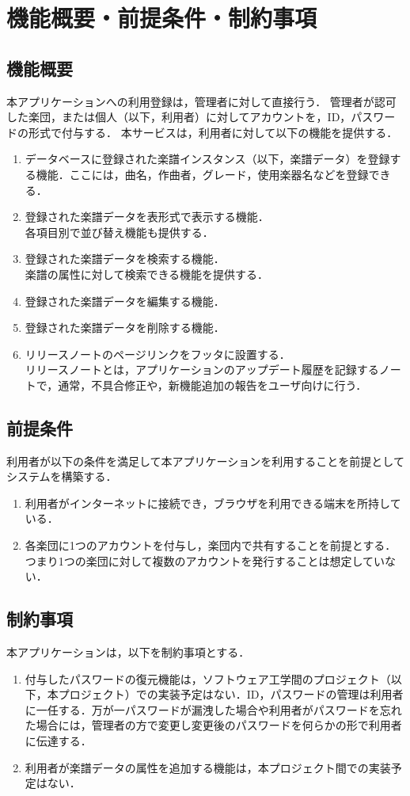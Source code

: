 \chapter{機能概要・前提条件・制約事項}
\section{機能概要}
本アプリケーションへの利用登録は，管理者に対して直接行う．
管理者が認可した楽団，または個人（以下，利用者）に対してアカウントを，ID，パスワードの形式で付与する．
本サービスは，利用者に対して以下の機能を提供する．
\begin{enumerate}
    \item データベースに登録された楽譜インスタンス（以下，楽譜データ）を登録する機能．ここには，曲名，作曲者，グレード，使用楽器名などを登録できる．
    \item 登録された楽譜データを表形式で表示する機能．\\
          各項目別で並び替え機能も提供する．
    \item 登録された楽譜データを検索する機能．\\
          楽譜の属性に対して検索できる機能を提供する．
    \item 登録された楽譜データを編集する機能．
    \item 登録された楽譜データを削除する機能．
    \item リリースノートのページリンクをフッタに設置する．\\
          リリースノートとは，アプリケーションのアップデート履歴を記録するノートで，通常，不具合修正や，新機能追加の報告をユーザ向けに行う．
\end{enumerate}
\section{前提条件}
利用者が以下の条件を満足して本アプリケーションを利用することを前提としてシステムを構築する．
\begin{enumerate}
    \item 利用者がインターネットに接続でき，ブラウザを利用できる端末を所持している．
    \item 各楽団に1つのアカウントを付与し，楽団内で共有することを前提とする．つまり1つの楽団に対して複数のアカウントを発行することは想定していない．
\end{enumerate}
\section{制約事項}
本アプリケーションは，以下を制約事項とする．
\begin{enumerate}
    \item 付与したパスワードの復元機能は，ソフトウェア工学間のプロジェクト（以下，本プロジェクト）での実装予定はない．ID，パスワードの管理は利用者に一任する．万が一パスワードが漏洩した場合や利用者がパスワードを忘れた場合には，管理者の方で変更し変更後のパスワードを何らかの形で利用者に伝達する．
    \item 利用者が楽譜データの属性を追加する機能は，本プロジェクト間での実装予定はない．
\end{enumerate}